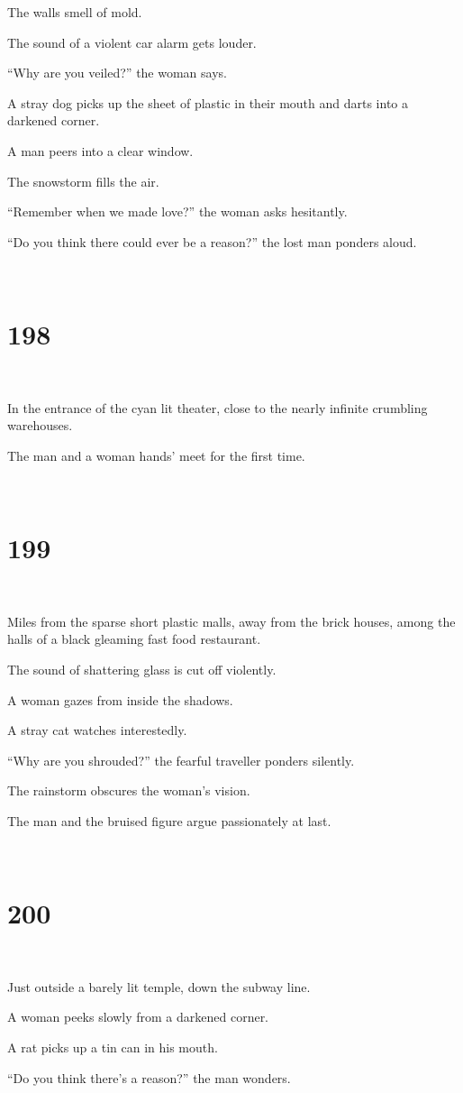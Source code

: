 \documentclass{report}
\begin{document}
The walls smell of mold.

The sound of a violent car alarm gets louder.

``Why are you veiled?'' the woman says.

A stray dog picks up the sheet of plastic in their mouth and darts into a darkened corner.

A man peers into a clear window.

The snowstorm fills the air.

``Remember when we made love?'' the woman asks hesitantly.

``Do you think there could ever be a reason?'' the lost man ponders aloud.

~
\chapter*{198}
~

In the entrance of the cyan lit theater, close to the nearly infinite crumbling warehouses.

The man and a woman hands' meet for the first time.

~
\chapter*{199}
~

Miles from the sparse short plastic malls, away from the brick houses, among the halls of a black gleaming fast food restaurant.

The sound of shattering glass is cut off violently.

A woman gazes from inside the shadows.

A stray cat watches interestedly.

``Why are you shrouded?'' the fearful traveller ponders silently.

The rainstorm obscures the woman's vision.

The man and the bruised figure argue passionately at last.

~
\chapter*{200}
~

Just outside a barely lit temple, down the subway line.

A woman peeks slowly from a darkened corner.

A rat picks up a tin can in his mouth.

``Do you think there's a reason?'' the man wonders.
\end{document}

